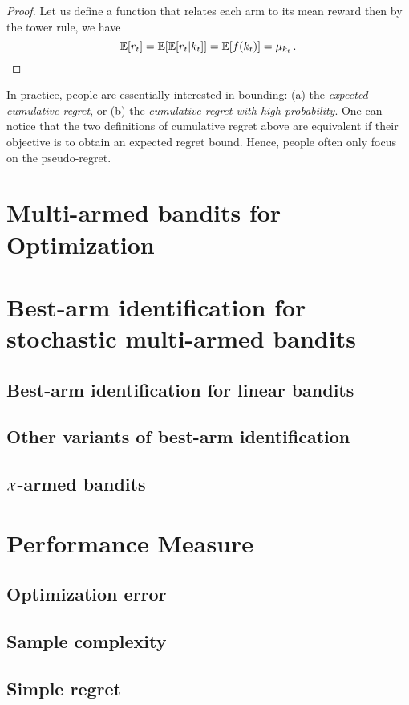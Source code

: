 \begin{proof}
	Let us define a function that relates each arm to its mean reward  then by the tower rule, we have
    \[
	    \mathbb{E}[r_t] = \mathbb{E}[\mathbb{E}[r_t|k_t]] = \mathbb{E}[f(k_t)] = \mu_{k_t}\,.
    \]
\end{proof}

In practice, people are essentially interested in bounding: (a) the \emph{expected cumulative regret}, or (b) the \emph{cumulative regret with high probability}. One can notice that the two definitions of cumulative regret above are equivalent if their objective is to obtain an expected regret bound. Hence, people often only focus on the pseudo-regret. 


\section{Multi-armed bandits for Optimization}\label{sec:mab.optim}

\section{Best-arm identification for stochastic multi-armed bandits}

\subsection{Best-arm identification for linear bandits}

\subsection{Other variants of best-arm identification}

\subsection{$\mathcal{X}$-armed bandits}

\section{Performance Measure}\label{sec:mab.performance}

\subsection{Optimization error}

\subsection{Sample complexity}

\subsection{Simple regret}